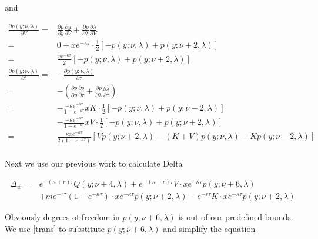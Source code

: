 and

\begin{equation}\label{pdf diff2}
    \begin{aligned}
        \frac{\partial p(y;\nu,\lambda)}{\partial V} =& \frac{\partial p}{\partial y}\frac{\partial y}{\partial V} + \frac{\partial p}{\partial \lambda} \frac{\partial \lambda}{\partial V} \\
        =& 0+ x e^{-\kappa \tau} \cdot \frac{1}{2} [-p(y; \nu, \lambda)+p(y ; \nu+2, \lambda)]\\
        =& \frac{x e^{-\kappa \tau}}{2} [-p(y ; \nu, \lambda)+p(y ; \nu+2, \lambda)] \\
        \frac{\partial p(y; \nu, \lambda)}{\partial t}=& -\frac{\partial p(y; \nu, \lambda)}{\partial \tau}\\
        =&-\left(\frac{\partial p}{\partial y}\frac{\partial y}{\partial \tau} + \frac{\partial p}{\partial \lambda} \frac{\partial \lambda}{\partial \tau}\right) \\
        =& -\frac{-\kappa e^{-\kappa \tau}}{1 - e^{-\kappa \tau}}xK \cdot  \frac{1}{2}[-p(y ; \nu, \lambda)+p(y ; \nu-2, \lambda)]\\
         &-\frac{-\kappa e^{-\kappa \tau}}{1 - e^{-\kappa \tau}}xV \cdot \frac{1}{2}[-p(y ; \nu, \lambda)+p(y ; \nu+2, \lambda)]\\
        =& \frac{\kappa x e^{-\kappa \tau}}{2(1 - e^{-\kappa \tau})} \left[Vp(y ; \nu+2, \lambda) - (K+V) p(y; \nu, \lambda) + K p(y; \nu-2, \lambda)\right]\\
    \end{aligned}
\end{equation}

Next we use our previous work to calculate Delta

\begin{equation}
    \begin{aligned}
        \Delta_{\bar{w}}=&  e^{ -(\kappa+r) \tau} Q(y ; \nu+4, \lambda) + e^{ -(\kappa+r) \tau}V \cdot x e^{-\kappa \tau} p(y ; \nu+6, \lambda)\\
        &+ m e^{-r \tau}(1-e^{-\kappa \tau}) \cdot x e^{-\kappa \tau} p(y ; \nu+2, \lambda) -e^{-r \tau} K \cdot x e^{-\kappa \tau} p(y ; \nu+2, \lambda)
        \end{aligned}
\end{equation}

\noindent Obviously degrees of freedom in $p(y;\nu+6,\lambda)$ is out of our predefined bounds. We use \eqref{trans} to substitute $p(y;\nu+6,\lambda)$ and simplify the equation

